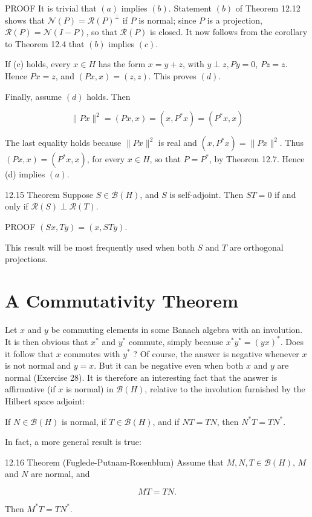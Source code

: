 \documentclass[10pt]{article}
\begin{document}
PROOF It is trivial that $(a)$ implies $(b)$. Statement $(b)$ of Theorem 12.12 shows that $\mathscr{N}(P)=\mathscr{R}(P)^{\perp}$ if $P$ is normal; since $P$ is a projection, $\mathscr{R}(P)=\mathscr{N}(I-P)$, so that $\mathscr{R}(P)$ is closed. It now follows from the corollary to Theorem 12.4 that $(b)$ implies $(c)$.

If (c) holds, every $x \in H$ has the form $x=y+z$, with $y \perp z, P y=0$, $P z=z$. Hence $P x=z$, and $(P x, x)=(z, z)$. This proves $(d)$.

Finally, assume $(d)$ holds. Then

$$
\|P x\|^{2}=(P x, x)=\left(x, P^{*} x\right)=\left(P^{*} x, x\right)
$$

The last equality holds because $\|P x\|^{2}$ is real and $\left(x, P^{*} x\right)=\|P x\|^{2}$. Thus $(P x, x)=\left(P^{*} x, x\right)$, for every $x \in H$, so that $P=P^{*}$, by Theorem 12.7. Hence (d) implies $(a)$.

12.15 Theorem Suppose $S \in \mathscr{B}(H)$, and $S$ is self-adjoint. Then $S T=0$ if and only if $\mathscr{R}(S) \perp \mathscr{R}(T)$.

PROOF $(S x, T y)=(x, S T y)$.

This result will be most frequently used when both $S$ and $T$ are orthogonal projections.

\section{A Commutativity Theorem}
Let $x$ and $y$ be commuting elements in some Banach algebra with an involution. It is then obvious that $x^{*}$ and $y^{*}$ commute, simply because $x^{*} y^{*}=(y x)^{*}$. Does it follow that $x$ commutes with $y^{*}$ ? Of course, the answer is negative whenever $x$ is not normal and $y=x$. But it can be negative even when both $x$ and $y$ are normal (Exercise 28). It is therefore an interesting fact that the answer is affirmative (if $x$ is normal) in $\mathscr{B}(H)$, relative to the involution furnished by the Hilbert space adjoint:

If $N \in \mathscr{B}(H)$ is normal, if $T \in \mathscr{B}(H)$, and if $N T=T N$, then $N^{*} T=T N^{*}$.

In fact, a more general result is true:

12.16 Theorem (Fuglede-Putnam-Rosenblum) Assume that $M, N, T \in \mathscr{B}(H)$, $M$ and $N$ are normal, and

$$
M T=T N .
$$

Then $M^{*} T=T N^{*}$.
\end{document}
